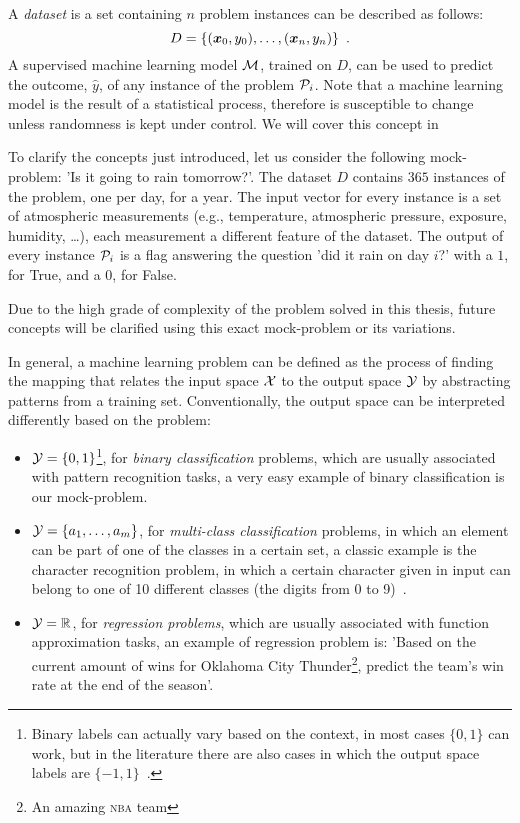 A \emph{dataset} is a set containing $n$ problem instances can be described as follows: \[D = \{(\boldsymbol{x}_0, y_0), \ldots, (\boldsymbol{x}_n, y_n)\}
\enspace.\] A supervised machine learning model $\mathcal{M}$, trained on $D$, can be used to predict the
outcome, $\hat{y}$, of any instance of the problem $\mathcal{P}_i$. Note that a machine learning model
is the result of a statistical process, therefore is susceptible to change unless randomness is kept
under control. We will cover this concept in 

To clarify the concepts just introduced, let us consider the following mock-problem: 'Is it going to rain
tomorrow?'. The dataset $D$ contains $365$ instances of the problem, one per day, for a year. The
input vector for every instance is a set of atmospheric measurements (e.g., temperature, atmospheric
pressure, exposure, humidity, \ldots), each measurement a different feature of the dataset. The
output of every instance $\mathcal{P}_i$ is a flag answering the question 'did it rain on day $i$?'
with a $1$, for True, and a $0$, for False.

Due to the high grade of complexity of the problem solved in this thesis, future concepts will be clarified
using this exact mock-problem or its variations.

In general, a machine learning problem can be defined as the process of finding the mapping that
relates the input space $\mathcal{X}$ to the output space $\mathcal{Y}$ by abstracting patterns from
a training set. Conventionally, the output space can be interpreted differently based on
the problem:
\begin{itemize}
	\item $\mathcal{Y} = \{0, 1\}$\footnote{Binary labels can actually vary based on the context, in
		most cases $\{0, 1\}$ can work, but in the literature there are also cases in which
		the output space labels are $\{-1, 1\}$~\cite{ZhouZhi-Hua2021ML}.}, for \emph{binary classification} problems, which are usually associated with pattern recognition tasks, a very easy example of binary classification is our mock-problem. 
	\item $\mathcal{Y} = \{a_1,\ldots, a_m\}$, for \emph{multi-class classification} problems, in
	      which an element can be part of one of the classes in a certain set, a classic
	      example is the character recognition problem, in which a certain character given in
		input can belong to one of 10 different classes (the digits from 0 to 9)~\cite{pal2010handwritten}.
	\item $\mathcal{Y} = \mathbb{R}$, for \emph{regression problems}, which are usually associated
	      with function approximation tasks, an example of regression problem
	      is: 'Based on the current amount of wins for Oklahoma City Thunder\footnote{An
		      amazing \textsc{nba} team}, predict the team's win rate at the end of the season'.
\end{itemize}

